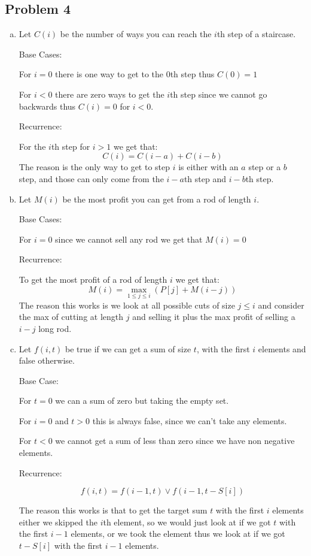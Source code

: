 \documentclass[12pt, letterpaper]{article}
\theoremstyle{definition}
\begin{document}
\subsection*{Problem 4}
\begin{enumerate}[(a)]
    \item Let $C(i)$ be the number of ways you can reach the $i$th step of a staircase.
    
    Base Cases:

    For $i=0$ there is one way to get to the $0$th step thus $C(0)=1$

    For $i < 0$ there are zero ways to get the $i$th step since we cannot go backwards thus $C(i)=0$ for $i<0$.

    Recurrence:

    For the $i$th step for $i>1$ we get that:
    \[C(i)=C(i-a)+C(i-b)\]
    The reason is the only way to get to step $i$ is either with an $a$ step or a $b$ step, and those can only come from the $i-a$th step and $i-b$th step.
    
    \item Let $M(i)$ be the most profit you can get from a rod of length $i$.
    
    Base Cases:

    For $i = 0$ since we cannot sell any rod we get that $M(i)=0$

    Recurrence:

    To get the most profit of a rod of length $i$ we get that:
    \[M(i)=\max_{1 \leq j \leq i}(P[j] + M(i - j))\]
    The reason this works is we look at all possible cuts of size $j \leq i$ and consider the max of cutting at length $j$ and selling it plus the max profit of selling a $i-j$ long rod.

    \item Let $f(i,t)$ be true if we can get a sum of size $t$, with the first $i$ elements and false otherwise.
    
    Base Case:

    For $t=0$ we can a sum of zero but taking the empty set.

    For $i=0$ and $t>0$ this is always false, since we can't take any elements.

    For $t < 0$ we cannot get a sum of less than zero since we have non negative elements.

    Recurrence:

    \[f(i,t)=f(i-1,t) \vee f(i-1,t-S[i])\]

    The reason this works is that to get the target sum $t$ with the first $i$ elements either we skipped the $i$th element, so we would just look at if we got $t$ with the first $i-1$ elements, or we took the element thus we look at if we got $t-S[i]$ with the first $i-1$ elements. 
\end{enumerate}
\end{document}
